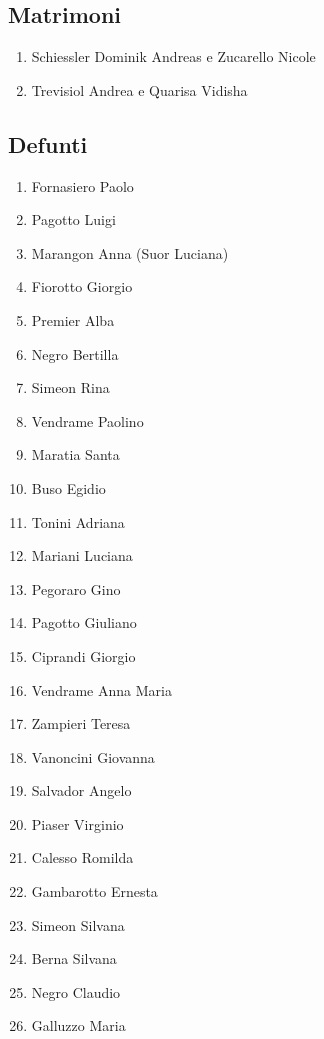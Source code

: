 \subsection{Matrimoni}
\begin{enumerate}
  \item Schiessler Dominik Andreas e Zucarello Nicole
  \item Trevisiol Andrea e Quarisa Vidisha
\end{enumerate}

\subsection{Defunti}
\begin{multicols}{2}
\begin{enumerate}
  \item Fornasiero Paolo
  \item Pagotto Luigi
  \item Marangon Anna (Suor Luciana)
  \item Fiorotto Giorgio
  \item Premier Alba
  \item Negro Bertilla
  \item Simeon Rina
  \item Vendrame Paolino
  \item Maratia Santa
  \item Buso Egidio
  \item Tonini Adriana
  \item Mariani Luciana
  \item Pegoraro Gino
  \item Pagotto Giuliano
  \item Ciprandi Giorgio
  \item Vendrame Anna Maria
  \item Zampieri Teresa
  \item Vanoncini Giovanna
  \item Salvador Angelo
  \item Piaser Virginio
  \item Calesso Romilda
  \item Gambarotto Ernesta
  \item Simeon Silvana
  \item Berna Silvana
  \item Negro Claudio
  \item Galluzzo Maria
\end{enumerate}
\end{multicols}

